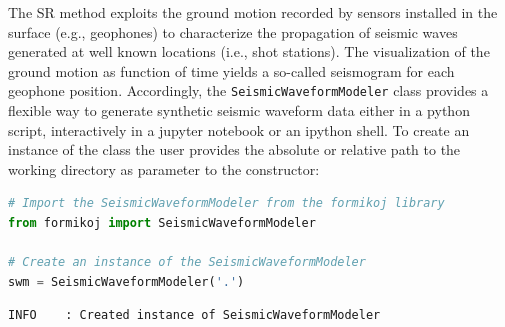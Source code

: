\documentclass[a4paper,fleqn]{cas-sc}
\begin{document}
The SR method exploits the ground motion recorded by sensors installed in the surface (e.g., geophones) to characterize the propagation of seismic waves generated at well known locations (i.e., shot stations). 
The visualization of the ground motion as function of time yields a so-called seismogram for each geophone position.
Accordingly, the \texttt{SeismicWaveformModeler} class provides a flexible way to generate synthetic seismic waveform data either in a python script, interactively in a jupyter notebook or an ipython shell.
To create an instance of the class the user provides the absolute or relative path to the working directory as parameter to the constructor:
\begin{lstlisting}[language=Python]
# Import the SeismicWaveformModeler from the formikoj library
from formikoj import SeismicWaveformModeler

# Create an instance of the SeismicWaveformModeler
swm = SeismicWaveformModeler('.')

\end{lstlisting}

\begin{footnotesize}
\begin{verbatim}
INFO    : Created instance of SeismicWaveformModeler
\end{verbatim}
\end{footnotesize}
\end{document}
